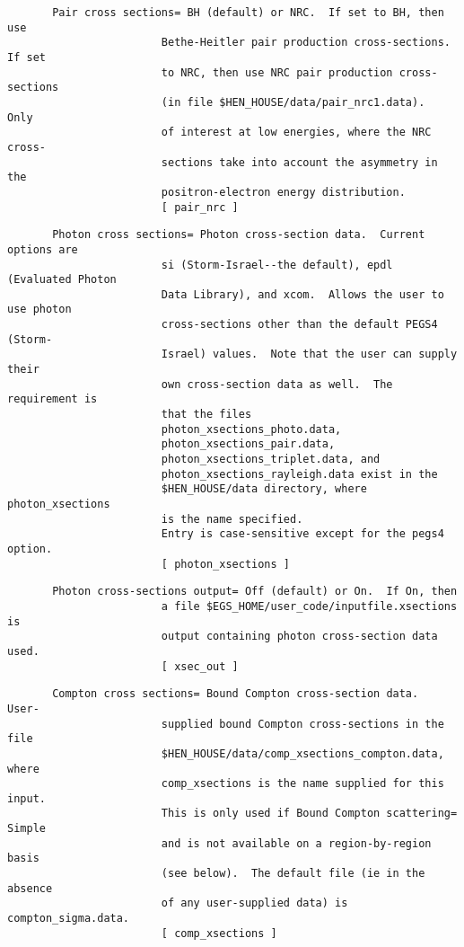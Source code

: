 \begin{verbatim}
       Pair cross sections= BH (default) or NRC.  If set to BH, then use
                        Bethe-Heitler pair production cross-sections.  If set
                        to NRC, then use NRC pair production cross-sections
                        (in file $HEN_HOUSE/data/pair_nrc1.data).  Only
                        of interest at low energies, where the NRC cross-
                        sections take into account the asymmetry in the
                        positron-electron energy distribution.
                        [ pair_nrc ]
\end{verbatim}
\begin{verbatim}
       Photon cross sections= Photon cross-section data.  Current options are
                        si (Storm-Israel--the default), epdl (Evaluated Photon
                        Data Library), and xcom.  Allows the user to use photon
                        cross-sections other than the default PEGS4 (Storm-
                        Israel) values.  Note that the user can supply their
                        own cross-section data as well.  The requirement is
                        that the files
                        photon_xsections_photo.data,
                        photon_xsections_pair.data,
                        photon_xsections_triplet.data, and
                        photon_xsections_rayleigh.data exist in the
                        $HEN_HOUSE/data directory, where photon_xsections
                        is the name specified.
                        Entry is case-sensitive except for the pegs4 option.
                        [ photon_xsections ]
\end{verbatim}
\begin{verbatim}
       Photon cross-sections output= Off (default) or On.  If On, then
                        a file $EGS_HOME/user_code/inputfile.xsections is
                        output containing photon cross-section data used.
                        [ xsec_out ]
\end{verbatim}
\begin{verbatim}
       Compton cross sections= Bound Compton cross-section data.  User-
                        supplied bound Compton cross-sections in the file
                        $HEN_HOUSE/data/comp_xsections_compton.data, where
                        comp_xsections is the name supplied for this input.
                        This is only used if Bound Compton scattering= Simple
                        and is not available on a region-by-region basis
                        (see below).  The default file (ie in the absence
                        of any user-supplied data) is compton_sigma.data.
                        [ comp_xsections ]
\end{verbatim}
